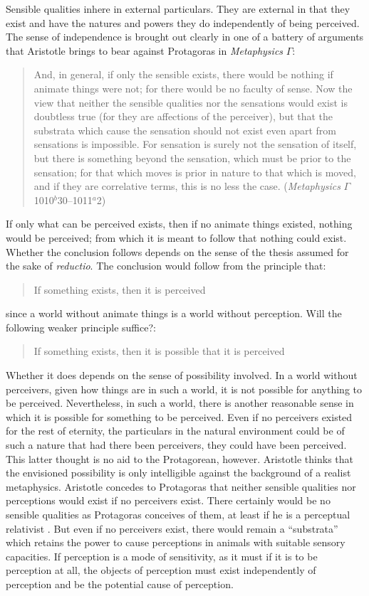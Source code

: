 Sensible qualities inhere in external particulars. They are external in that they exist and have the natures and powers they do independently of being perceived. The sense of independence is brought out clearly in one of a battery of arguments that Aristotle brings to bear against Protagoras in \emph{Metaphysics} \( \Gamma \):
\begin{quote}
	And, in general, if only the sensible exists, there would be nothing if animate things were not; for there would be no faculty of sense. Now the view that neither the sensible qualities nor the sensations would exist is doubtless true (for they are affections of the perceiver), but that the substrata which cause the sensation should not exist even apart from sensations is impossible. For sensation is surely not the sensation of itself, but there is something beyond the sensation, which must be prior to the sensation; for that which moves is prior in nature to that which is moved, and if they are correlative terms, this is no less the case. (\emph{Metaphysics} \( \Gamma \) 1010\( ^{b} \)30--1011\( ^{a} \)2)
\end{quote}

If only what can be perceived exists, then if no animate things existed, nothing would be perceived; from which it is meant to follow that nothing could exist. Whether the conclusion follows depends on the sense of the thesis assumed for the sake of \emph{reductio}. The conclusion would follow from the principle that:
\begin{quote}
	If something exists, then it is perceived
\end{quote}
since a world without animate things is a world without perception. Will the following weaker principle suffice?:
\begin{quote}
	If something exists, then it is possible that it is perceived 
\end{quote}
Whether it does depends on the sense of possibility involved. In a world without perceivers, given how things are in such a world, it is not possible for anything to be perceived. Nevertheless, in such a world, there is another reasonable sense in which it is possible for something to be perceived. Even if no perceivers existed for the rest of eternity, the particulars in the natural environment could be of such a nature that had there been perceivers, they could have been perceived. This latter thought is no aid to the Protagorean, however. Aristotle thinks that the envisioned possibility is only intelligible against the background of a realist metaphysics. Aristotle concedes to Protagoras that neither sensible qualities nor perceptions would exist if no perceivers exist. There certainly would be no sensible qualities as Protagoras conceives of them, at least if he is a perceptual relativist . But even if no perceivers exist, there would remain a ``substrata'' which retains the power to cause perceptions in animals with suitable sensory capacities. If perception is a mode of sensitivity, as it must if it is to be perception at all, the objects of perception must exist independently of perception and be the potential cause of perception.

